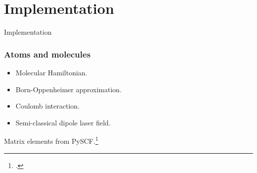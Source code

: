 \documentclass{beamer}
\begin{document}

\section{Implementation}

\begin{frame}[plain, c]
    \begin{center}
        \Huge Implementation
    \end{center}
\end{frame}

\begin{frame}
    \frametitle{Atoms and molecules}
    \begin{itemize}
        \item Molecular Hamiltonian.
        \item Born-Oppenheimer approximation.
        \item Coulomb interaction.
        \item Semi-classical dipole laser field.
    \end{itemize}
    Matrix elements from PySCF.\footcite{pyscf}
\end{frame}
\end{document}
